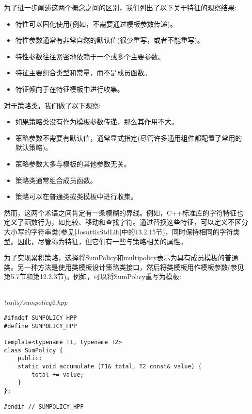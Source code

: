 为了进一步阐述这两个概念之间的区别，我们列出了以下关于特征的观察结果:

\begin{itemize}
\item 
特性可以固化使用(例如，不需要通过模板参数传递)。

\item 
特性参数通常有非常自然的默认值(很少重写，或者不能重写)。

\item 
特性参数往往紧密地依赖于一个或多个主要参数。

\item 
特征主要组合类型和常量，而不是成员函数。

\item 
特征倾向于在特征模板中进行收集。
\end{itemize}

对于策略类，我们做了以下观察:

\begin{itemize}
\item 
如果策略类没有作为模板参数传递，那么其作用不大。

\item 
策略参数不需要有默认值，通常显式指定(尽管许多通用组件都配置了常用的默认策略)。

\item 
策略参数大多与模板的其他参数无关。

\item 
策略类通常组合成员函数。

\item 
策略可以在普通类或类模板中进行收集。
\end{itemize}

然而，这两个术语之间肯定有一条模糊的界线。例如，C++标准库的字符特征也定义了函数行为，如比较、移动和查找字符。通过替换这些特征，可以定义不区分大小写的字符串类(参见[JosuttisStdLib]中的13.2.15节)，同时保持相同的字符类型。因此，尽管称为特征，但它们有一些与策略相关的属性。


为了实现累积策略，选择将SumPolicy和multipolicy表示为具有成员模板的普通类。另一种方法是使用类模板设计策略类接口，然后将类模板用作模板参数(参见第5.7节和第12.2.3节)。例如，可以将SumPolicy重写为模板:

\hspace*{\fill} \\ %
\noindent
\textit{traits/sumpolicy2.hpp}
\begin{lstlisting}[style=styleCXX]
#ifndef SUMPOLICY_HPP
#define SUMPOLICY_HPP

template<typename T1, typename T2>
class SumPolicy {
	public:
	static void accumulate (T1& total, T2 const& value) {
		total += value;
	}
};

#endif // SUMPOLICY_HPP
\end{lstlisting}

